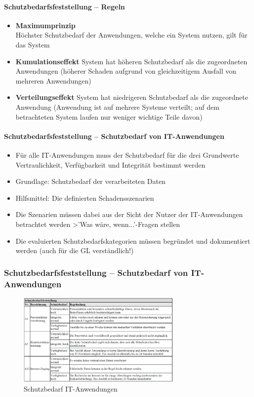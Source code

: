 \documentclass[10pt,a4paper]{article}
\begin{document}
\paragraph*{Schutzbedarfsfeststellung – Regeln}
\begin{itemize}[noitemsep,topsep=0pt,leftmargin=*]
    \item \textbf{Maximumprinzip}\\
    Höchster Schutzbedarf der Anwendungen, welche ein
    System nutzen, gilt für das System
    \item \textbf{Kumulationseffekt}
    System hat höheren Schutzbedarf als die zugeordneten
    Anwendungen (höherer Schaden aufgrund von
    gleichzeitigem Ausfall von mehreren Anwendungen)
    \item \textbf{Verteilungseffekt}
    System hat niedrigeren Schutzbedarf als die zugeordnete
    Anwendung (Anwendung ist auf mehrere Systeme verteilt;
    auf dem betrachteten System laufen nur weniger wichtige
    Teile davon)
\end{itemize}

\paragraph*{Schutzbedarfsfeststellung – Schutzbedarf von IT-Anwendungen}
\begin{itemize}[noitemsep,topsep=0pt,leftmargin=*]
    \item Für alle IT-Anwendungen muss der Schutzbedarf für die
    drei Grundwerte Vertraulichkeit, Verfügbarkeit und
    Integrität bestimmt werden
    \item Grundlage: Schutzbedarf der verarbeiteten Daten
    \item Hilfsmittel: Die definierten Schadensszenarien
    \item Die Szenarien müssen dabei aus der Sicht der Nutzer der
    IT-Anwendungen betrachtet werden \textgreater 'Was wäre,
    wenn...'-Fragen stellen
    \item Die evaluierten Schutzbedarfskategorien müssen begründet
    und dokumentiert werden (auch für die GL verständlich!)
\end{itemize}

\subsubsection*{Schutzbedarfsfeststellung – Schutzbedarf von IT-Anwendungen}
\begin{figure}[H]
    \begin{center}
    \includegraphics[width=8cm]{images/Schutzbedarf IT-Anwendungen.png}
    \caption{Schutzbedarf IT-Anwendungen}
    \label{Schutzbedarf IT-Anwendungen}
    \end{center}
\end{figure}
\end{document}
